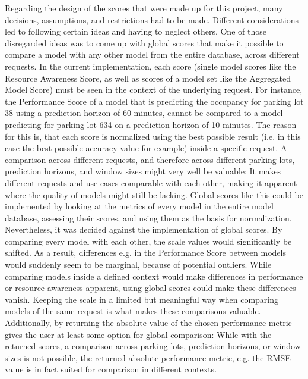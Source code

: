 Regarding the design of the scores that were made up for this project, many decisions, assumptions, and restrictions had to be made. Different considerations led to following certain ideas and having to neglect others. One of those disregarded ideas was to come up with global scores that make it possible to compare a model with any other model from the entire database, across different requests. In the current implementation, each score (single model scores like the Resource Awareness Score, as well as scores of a model set like the Aggregated Model Score) must be seen in the context of the underlying request. For instance, the Performance Score of a model that is predicting the occupancy for parking lot 38 using a prediction horizon of 60 minutes, cannot be compared to a model predicting for parking lot 634 on a prediction horizon of 10 minutes. The reason for this is, that each score is normalized using the best possible result (i.e. in this case the best possible accuracy value for example) inside a specific request. A comparison across different requests, and therefore across different parking lots, prediction horizons, and window sizes might very well be valuable: It makes different requests and use cases comparable with each other, making it apparent where the quality of models might still be lacking. Global scores like this could be implemented by looking at the metrics of every model in the entire model database, assessing their scores, and using them as the basis for normalization. Nevertheless, it was decided against the implementation of global scores. By comparing every model with each other, the scale values would significantly be shifted. As a result, differences e.g. in the Performance Score between models would suddenly seem to be marginal, because of potential outliers. While comparing models inside a defined context would make differences in performance or resource awareness apparent, using global scores could make these differences vanish. Keeping the scale in a limited but meaningful way when comparing models of the same request is what makes these comparisons valuable. Additionally, by returning the absolute value of the chosen performance metric gives the user at least some option for global comparison: While with the returned scores, a comparison across parking lots, prediction horizons, or window sizes is not possible, the returned absolute performance metric, e.g. the RMSE value is in fact suited for comparison in different contexts. 

